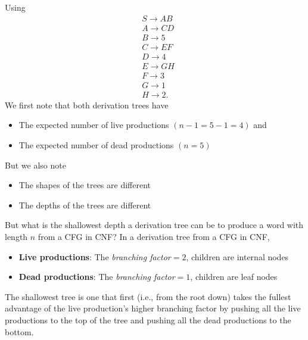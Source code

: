 \documentclass{report}
\begin{document}
\begin{itemize}
            \bigbreak \noindent 
            Using
            \begin{align*}
                &S \to AB \\
                &A \to CD \\
                &B \to 5 \\
                &C \to EF \\ 
                &D \to 4 \\ 
                &E \to GH \\
                &F \to 3 \\
                &G \to 1 \\
                &H \to 2
            .\end{align*}
            \bigbreak \noindent 
            We first note that both derivation trees have
            \begin{itemize}
                \item The expected number of live productions $(n-1 = 5-1 = 4)$ and
                \item The expected number of dead productions $(n = 5)$
            \end{itemize}
            \bigbreak \noindent 
            But we also note
            \begin{itemize}
                \item The shapes of the trees are different
                \item The depths of the trees are different
            \end{itemize}
            \bigbreak \noindent 
            But what is the shallowest depth a derivation tree can be to produce a word with length $n$ from a CFG in CNF?
            \bigbreak \noindent 
            In a derivation tree from a CFG in CNF, 
            \begin{itemize}
                \item \textbf{Live productions}: The \textit{branching factor}$ = 2$, children are internal nodes
                \item \textbf{Dead productions}: The \textit{branching factor}$ = 1$, children are leaf nodes
            \end{itemize}
            \bigbreak \noindent 
            The shallowest tree is one that first (i.e., from the root down) takes the fullest advantage of the live production’s higher branching factor by pushing all the live productions to the top of the tree and pushing all the dead productions to the bottom.
            \bigbreak \noindent 

\end{itemize}
\end{document}
